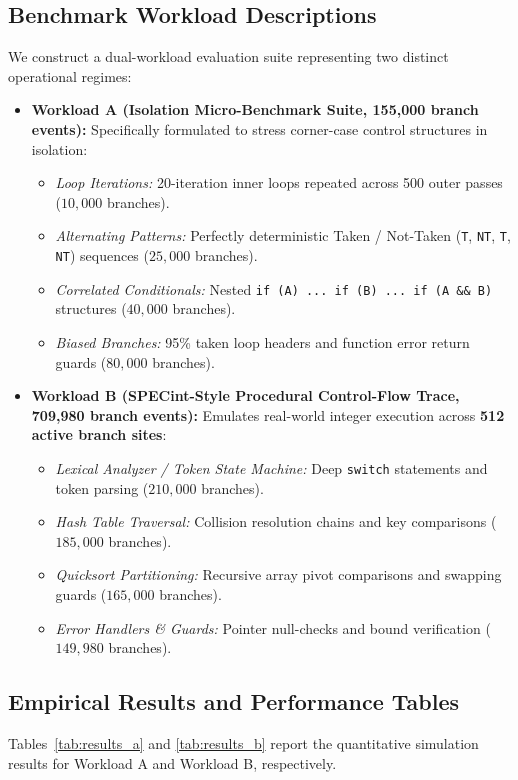 \documentclass[11pt,a4paper]{article}
\begin{document}
\subsection{Benchmark Workload Descriptions}
We construct a dual-workload evaluation suite representing two distinct operational regimes:
\begin{itemize}[leftmargin=1.5em, itemsep=0.3em]
    \item \textbf{Workload A (Isolation Micro-Benchmark Suite, 155,000 branch events):} Specifically formulated to stress corner-case control structures in isolation:
    \begin{itemize}[leftmargin=1.5em]
        \item \textit{Loop Iterations:} 20-iteration inner loops repeated across 500 outer passes ($10,000$ branches).
        \item \textit{Alternating Patterns:} Perfectly deterministic Taken / Not-Taken (\texttt{T}, \texttt{NT}, \texttt{T}, \texttt{NT}) sequences ($25,000$ branches).
        \item \textit{Correlated Conditionals:} Nested \texttt{if (A) ... if (B) ... if (A \&\& B)} structures ($40,000$ branches).
        \item \textit{Biased Branches:} 95\% taken loop headers and function error return guards ($80,000$ branches).
    \end{itemize}
    \item \textbf{Workload B (SPECint-Style Procedural Control-Flow Trace, 709,980 branch events):} Emulates real-world integer execution across \textbf{512 active branch sites}:
    \begin{itemize}[leftmargin=1.5em]
        \item \textit{Lexical Analyzer / Token State Machine:} Deep \texttt{switch} statements and token parsing ($210,000$ branches).
        \item \textit{Hash Table Traversal:} Collision resolution chains and key comparisons ($185,000$ branches).
        \item \textit{Quicksort Partitioning:} Recursive array pivot comparisons and swapping guards ($165,000$ branches).
        \item \textit{Error Handlers \& Guards:} Pointer null-checks and bound verification ($149,980$ branches).
    \end{itemize}
\end{itemize}

\subsection{Empirical Results and Performance Tables}
Tables~\ref{tab:results_a} and \ref{tab:results_b} report the quantitative simulation results for Workload A and Workload B, respectively.
\end{document}
